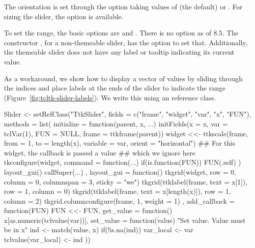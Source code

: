 The orientation is set through the option 
taking values of  (the default) or
. For sizing the slider, the 
option is available.  

To set the range, the basic options are  and
. There is no  option as of \TK\/
8.5. The constructor , for a non-themeable slider,
has the option  to set that. Additionally,
the themeable slider does not have any label or tooltip indicating its
current value.


As a workaround, we show how to display a vector of values by sliding
through the indices and place labels at the ends of the slider to
indicate the range (Figure~\ref{fig:tcltk-slider-labels}). We write
this using an \R{} reference class.

\begin{Schunk}
\begin{Sinput}
 Slider <-
   setRefClass("TtkSlider",
      fields = c("frame", "widget", "var", "x", "FUN"),
      methods = list(
        initialize = function(parent, x, ...) {
          initFields(x = x, var = tclVar(1),
                     FUN = NULL, frame = ttkframe(parent))
          widget <<- ttkscale(frame, from = 1, to = length(x),
                              variable = var, orient = "horizontal")
          ## For this widget, the callback is passed a value 
          ## which we ignore here
          tkconfigure(widget, command = function(...) {
            if(is.function(FUN)) FUN(.self)
          })
          layout_gui()
          callSuper(...)
        },
        layout_gui = function() {         
          tkgrid(widget, row = 0, column = 0, columnspan = 3, 
                 sticky = "we")
          tkgrid(ttklabel(frame, text = x[1]), 
                 row = 1, column = 0)
          tkgrid(ttklabel(frame, text = x[length(x)]), 
                 row = 1, column = 2)
          tkgrid.columnconfigure(frame, 1, weight = 1)
        },
        add_callback = function(FUN) FUN <<- FUN,
        get_value = function() x[as.numeric(tclvalue(var))],
        set_value = function(value) {
          "Set value. Value must be in x"
          ind <- match(value, x)
          if(!is.na(ind)) {
            var_local <- var
            tclvalue(var_local) <- ind
          }
        }
        ))
\end{Sinput}
\end{Schunk}


